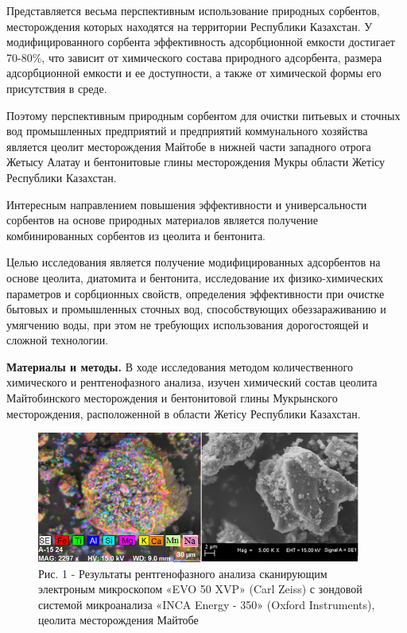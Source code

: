 \begin{multicols}{2}
Представляется весьма перспективным использование природных сорбентов,
месторождения которых находятся на территории Республики Казахстан. У
модифицированного сорбента эффективность адсорбционной емкости достигает
70-80\%, что зависит от химического состава природного адсорбента,
размера адсорбционной емкости и ее доступности, а также от химической
формы его присутствия в среде.

Поэтому перспективным природным сорбентом для очистки питьевых и сточных
вод промышленных предприятий и предприятий коммунального хозяйства
является цеолит месторождения Майтобе в нижней части западного отрога
Жетысу Алатау и бентонитовые глины месторождения Мукры области Жетісу
Республики Казахстан.

Интересным направлением повышения эффективности и универсальности
сорбентов на основе природных материалов является получение
комбинированных сорбентов из цеолита и бентонита.

Целью исследования является получение модифицированных адсорбентов на
основе цеолита, диатомита и бентонита, исследование их физико-химических
параметров и сорбционных свойств, определения эффективности при очистке
бытовых и промышленных сточных вод, способствующих обеззараживанию и
умягчению воды, при этом не требующих использования дорогостоящей и
сложной технологии.

{\bfseries Материалы и методы.} В ходе исследования методом количественного
химического и рентгенофазного анализа, изучен химический состав цеолита
Майтобинского месторождения и бентонитовой глины Мукрынского
месторождения, расположенной в области Жетісу Республики Казахстан.
\end{multicols}

\begin{figure}[H]
	\centering
	\includegraphics[width=0.95\textwidth]{media/chem/image1}
	\caption*{Рис. 1 - Результаты рентгенофазного анализа сканирующим
электроным микроскопом «EVO 50 XVP» (Carl Zeiss) с зондовой системой
микроанализа «INCA Energy - 350» (Oxford Instruments), цеолита
месторождения Майтобе}
\end{figure}

